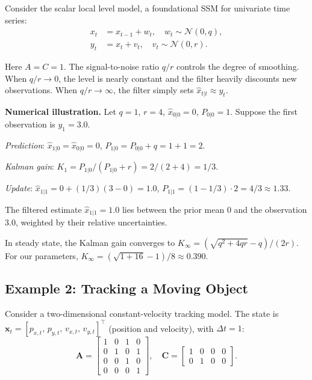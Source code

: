\documentclass[conference]{IEEEtran}
\begin{document}
Consider the scalar local level model, a foundational SSM for univariate time series:
\begin{align}
x_t &= x_{t-1} + w_t, \quad w_t \sim \mathcal{N}(0, q), \\
y_t &= x_t + v_t, \quad v_t \sim \mathcal{N}(0, r).
\end{align}

Here $A = C = 1$. The signal-to-noise ratio $q/r$ controls the degree of smoothing. When $q/r \to 0$, the level is nearly constant and the filter heavily discounts new observations. When $q/r \to \infty$, the filter simply sets $\hat{x}_{t|t} \approx y_t$.

\textbf{Numerical illustration.} Let $q = 1$, $r = 4$, $\hat{x}_{0|0} = 0$, $P_{0|0} = 1$. Suppose the first observation is $y_1 = 3.0$.

\textit{Prediction}: $\hat{x}_{1|0} = \hat{x}_{0|0} = 0$, $P_{1|0} = P_{0|0} + q = 1 + 1 = 2$.

\textit{Kalman gain}: $K_1 = P_{1|0} / (P_{1|0} + r) = 2/(2+4) = 1/3$.

\textit{Update}: $\hat{x}_{1|1} = 0 + (1/3)(3 - 0) = 1.0$, $P_{1|1} = (1 - 1/3) \cdot 2 = 4/3 \approx 1.33$.

The filtered estimate $\hat{x}_{1|1} = 1.0$ lies between the prior mean $0$ and the observation $3.0$, weighted by their relative uncertainties.

In steady state, the Kalman gain converges to $K_\infty = (\sqrt{q^2 + 4qr} - q) / (2r)$. For our parameters, $K_\infty = (\sqrt{1 + 16} - 1)/8 \approx 0.390$.

\subsection{Example 2: Tracking a Moving Object}

Consider a two-dimensional constant-velocity tracking model. The state is $\mathbf{x}_t = [p_{x,t},\, p_{y,t},\, v_{x,t},\, v_{y,t}]^\top$ (position and velocity), with $\Delta t = 1$:
\begin{equation}
\mathbf{A} = \begin{bmatrix} 1 & 0 & 1 & 0 \\ 0 & 1 & 0 & 1 \\ 0 & 0 & 1 & 0 \\ 0 & 0 & 0 & 1 \end{bmatrix}, \quad \mathbf{C} = \begin{bmatrix} 1 & 0 & 0 & 0 \\ 0 & 1 & 0 & 0 \end{bmatrix}.
\end{equation}
\end{document}
